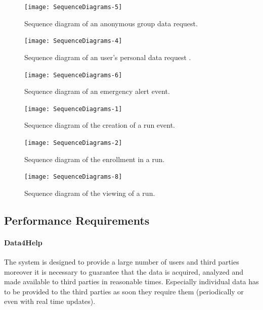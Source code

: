 \documentclass[a4paper]{article}
\begin{document}
\begin{figure}
    \centering
    \texttt{[image: SequenceDiagrams-5]}
    \caption{Sequence diagram of an anonymous group data request.}
    \label{fig:my_label}
\end{figure}
\clearpage

\begin{figure}
    \centering
    \texttt{[image: SequenceDiagrams-4]}
    \caption{Sequence diagram of an user's personal data request .}
    \label{fig:my_label}
\end{figure}
\clearpage

\begin{figure}
    \centering
    \texttt{[image: SequenceDiagrams-6]}
    \caption{Sequence diagram of an emergency alert event.}
    \label{fig:my_label}
\end{figure}
\clearpage

\begin{figure}
    \centering
    \texttt{[image: SequenceDiagrams-1]}
    \caption{Sequence diagram of the creation of a run event.}
    \label{fig:my_label}
\end{figure}
\clearpage

\begin{figure}
    \centering
    \texttt{[image: SequenceDiagrams-2]}
    \caption{Sequence diagram of the enrollment in a run.}
    \label{fig:my_label}
\end{figure}
\clearpage

\begin{figure}
    \centering
    \texttt{[image: SequenceDiagrams-8]}
    \caption{Sequence diagram of the viewing of a run.}
    \label{fig:my_label}
\end{figure}
\clearpage

\subsection{Performance Requirements}

\paragraph{Data4Help} The system is designed to provide a large number of users and third parties moreover it is necessary to guarantee that the data is acquired, analyzed and made available to third parties in reasonable times. Especially individual data has to be provided to the third parties as soon they require them (periodically or even with real time updates).
\end{document}
